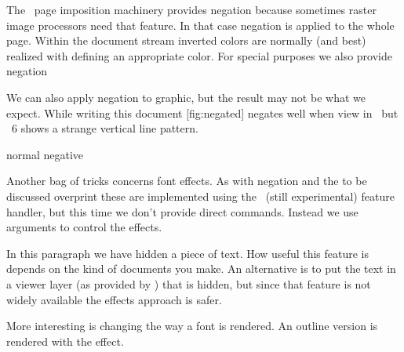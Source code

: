 \subject{Being negative}

The \CONTEXT\ page imposition machinery provides negation because sometimes
raster image processors need that feature. In that case negation is applied to
the whole page. Within the document stream inverted colors are normally (and
best) realized with defining an appropriate color. For special purposes we also
provide negation

\startbuffer
\startcolor[red]\ignorespaces
    
    \startnegative\ignorespaces
        
        \startpositive\ignorespaces
            
        \removeunwantedspaces\stoppositive
        
    \removeunwantedspaces\stopnegative
    
\removeunwantedspaces\stopcolor
\stopbuffer

\typebuffer \getbuffer

We can also apply negation to graphic, but the result may not be what we expect.
While writing this document  [fig:negated] negates well when view in
\GHOSTSCRIPT\ but \ACROBAT~6 shows a strange vertical line pattern.

\startbuffer
\startcombination
  {\startpositive
   \stoppositive}
  {normal}
  {\startnegative
   \stopnegative}
  {negative}
\stopcombination
\stopbuffer

\typebuffer

  {\getbuffer}

\subject{Font effects}

Another bag of tricks concerns font effects. As with negation and the to be
discussed overprint these are implemented using the \CONTEXT\ (still
experimental) feature handler, but this time we don't provide direct commands.
Instead we use arguments to control the effects.

\startbuffer
In this paragraph we have \starteffect[hidden]hidden a piece of
text\stopeffect. How useful this feature is depends on the kind
of documents you make. An alternative is to put the text in a
viewer layer (\starteffect[hidden]as provided by \PDF\stopeffect)
that is hidden, but since that feature is not widely available
the effects approach is safer.
\stopbuffer

\typebuffer \getbuffer

More interesting is changing the way a font is rendered. An outline version is
rendered with the  effect.

